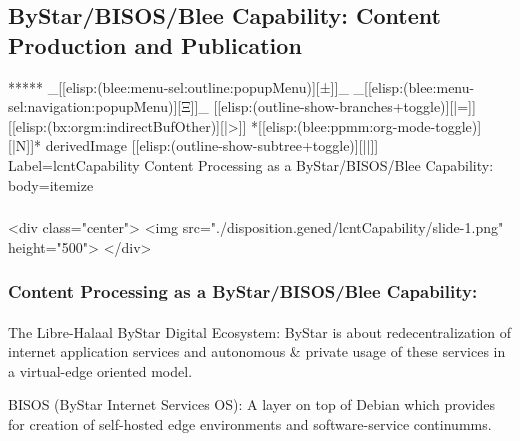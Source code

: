 \begin{whenOrg}
\section{ByStar/BISOS/Blee Capability: Content Production and Publication}

\begin{whenOrg}
*****  _[[elisp:(blee:menu-sel:outline:popupMenu)][±]]_ _[[elisp:(blee:menu-sel:navigation:popupMenu)][Ξ]]_ [[elisp:(outline-show-branches+toggle)][|=]] [[elisp:(bx:orgm:indirectBufOther)][|>]] *[[elisp:(blee:ppmm:org-mode-toggle)][|N]]*  derivedImage [[elisp:(outline-show-subtree+toggle)][||]] Label=lcntCapability Content Processing as a ByStar/BISOS/Blee Capability: body=itemize
\end{whenOrg}

\begin{htmlonly}

\begin{frame}[fragile,plain,label=lcntCapability]
    \frametitle{}
    \framesubtitle{}
    \begin{rawhtml}
<div class="center">
<img src="./disposition.gened/lcntCapability/slide-1.png" height="500">
</div>
    \end{rawhtml}
\end{frame}
\end{htmlonly}

\begin{verblatex}

\begin{frame}[fragile,plain,label=lcntCapability]
    \frametitle{Content Processing as a ByStar/BISOS/Blee Capability:}
    \framesubtitle{}


    \begin{block}{The Libre-Halaal ByStar Digital Ecosystem:}
           ByStar is about redecentralization of internet application services and autonomous \& private usage of these services in a virtual-edge oriented model.
    \end{block}

    \begin{block}{BISOS (ByStar Internet Services OS):}
           A layer on top of Debian which provides for creation of self-hosted edge environments and software-service continumms.
    \end{block}


\end{frame}
\end{verblatex}
\end{whenOrg}
